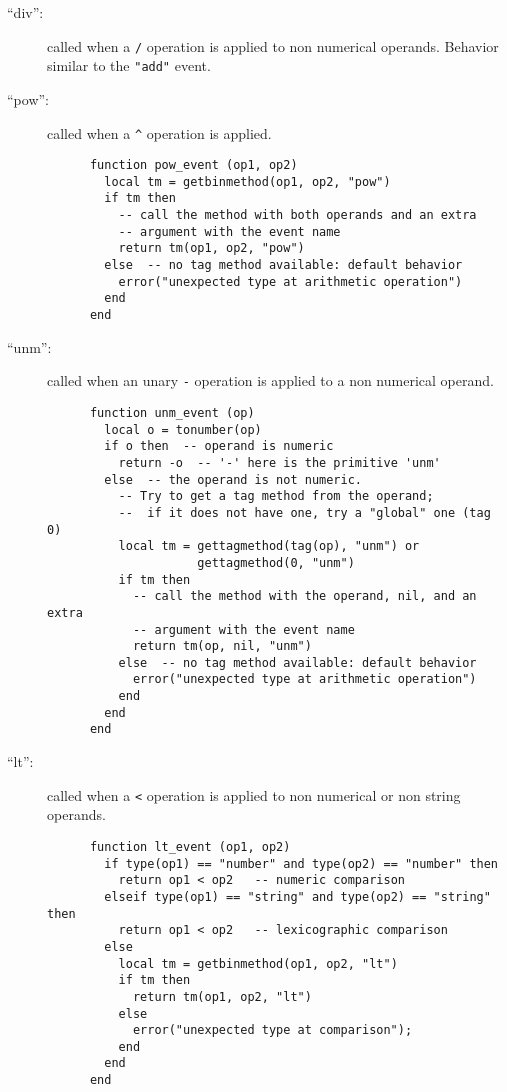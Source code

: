 \begin{description}
\item[``div'':]
called when a \verb|/| operation is applied to non numerical operands.
Behavior similar to the \verb|"add"| event.

\item[``pow'':]
called when a \verb|^| operation is applied.
\begin{verbatim}
      function pow_event (op1, op2)
        local tm = getbinmethod(op1, op2, "pow")
        if tm then
          -- call the method with both operands and an extra
          -- argument with the event name
          return tm(op1, op2, "pow")
        else  -- no tag method available: default behavior
          error("unexpected type at arithmetic operation")
        end
      end
\end{verbatim}

\item[``unm'':]
called when an unary \verb|-| operation is applied to a non numerical operand.
\begin{verbatim}
      function unm_event (op)
        local o = tonumber(op)
        if o then  -- operand is numeric
          return -o  -- '-' here is the primitive 'unm'
        else  -- the operand is not numeric.
          -- Try to get a tag method from the operand;
          --  if it does not have one, try a "global" one (tag 0)
          local tm = gettagmethod(tag(op), "unm") or
                     gettagmethod(0, "unm")
          if tm then
            -- call the method with the operand, nil, and an extra
            -- argument with the event name
            return tm(op, nil, "unm")
          else  -- no tag method available: default behavior
            error("unexpected type at arithmetic operation")
          end
        end
      end
\end{verbatim}

\item[``lt'':]
called when a \verb|<| operation is applied to non numerical
or non string operands.
\begin{verbatim}
      function lt_event (op1, op2)
        if type(op1) == "number" and type(op2) == "number" then
          return op1 < op2   -- numeric comparison
        elseif type(op1) == "string" and type(op2) == "string" then
          return op1 < op2   -- lexicographic comparison
        else
          local tm = getbinmethod(op1, op2, "lt")
          if tm then
            return tm(op1, op2, "lt")
          else
            error("unexpected type at comparison");
          end
        end
      end
\end{verbatim}


\end{description}
